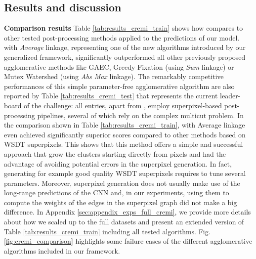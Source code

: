 

\subsection{Results and discussion}\label{sec:results}
\textbf{Comparison results } Table \ref{tab:results_cremi_train} shows how \algname{} compares to other tested post-processing methods applied to the predictions of our model. 
\algname{} with \emph{Average} linkage, representing one of the new algorithms introduced by our generalized framework, significantly outperformed all other previously proposed agglomerative methods like GAEC, Greedy Fixation (using \emph{Sum} linkage) or Mutex Watershed (using \emph{Abs Max} linkage). The remarkably competitive performances of this simple parameter-free agglomerative algorithm are also reported by Table \ref{tab:results_cremi_test} that represents the current leader-board of the challenge: all entries, apart from \algname{}, employ superpixel-based post-processing pipelines, several of which rely on the complex multicut problem. 
In the comparison shown in Table \ref{tab:results_cremi_train}, \algname{} with Average linkage even achieved significantly superior scores compared to other methods based on WSDT superpixels.
This shows that this method offers a simple and successful approach that grow the clusters starting directly from pixels and had the advantage of avoiding potential errors in the superpixel generation. In fact, generating for example good quality WSDT superpixels requires to tune several parameters.   
Moreover, superpixel generation does not usually make use of the long-range predictions of the CNN and, in our experiments, using them to compute the weights of the edges in the superpixel graph did not make a big difference.
In Appendix \ref{sec:appendix_exps_full_cremi}, we provide more details about how we scaled up \algname{} to the full datasets and present an extended version of Table \ref{tab:results_cremi_train} including all tested \algname{} algorithms.
Fig. \ref{fig:cremi_comparison} highlights some failure cases of the different agglomerative algorithms included in our framework.

